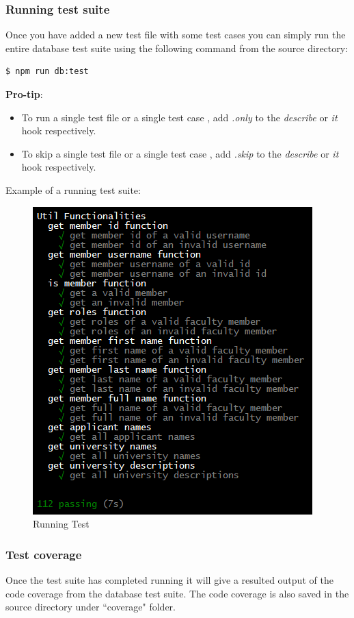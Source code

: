 \documentclass[fontsize=12pt,paper=letter,twoside]{scrartcl}
\begin{document}
\newpage
\subsubsection{Running test suite}
Once you have added a new test file with some test cases you can simply run the entire database test suite using the following command from the source directory:

\begin{lstlisting}[language=bash]
	$ npm run db:test
\end{lstlisting}

\bigskip
\noindent \textbf{Pro-tip}: 
\begin{itemize}
\item To run a single test file or a single test case , add \emph{.only} to the \emph{describe} or \emph{it} hook respectively.
\item To skip a single test file or a single test case , add \emph{.skip} to the \emph{describe} or \emph{it} hook respectively.  
\end{itemize}

\bigskip
\noindent Example of a running test suite:

\begin{figure}[!htb]
\begin{center}
\includegraphics[width=.6\textwidth]{images/database/run_test.png}
\end{center}
\caption{Running Test}
\label{fig:db/run_test}
\end{figure} 

\newpage
\subsubsection{Test coverage}
Once the test suite has completed running it will give a resulted output of the code coverage from the database test suite. The code coverage is also saved in the source directory under ``coverage" folder.
\end{document}
